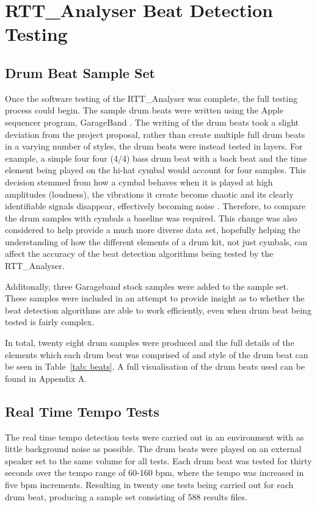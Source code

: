 \documentclass[a4paper, 11pt]{article}
\begin{document}
\maketitle{}\section{RTT\_Analyser Beat Detection Testing}
\subsection{Drum Beat Sample Set}
Once the software testing of the RTT\_Analyser was complete, the full testing process could begin. The sample drum beats were written using the Apple sequencer program, GarageBand \cite{garage}. The writing of the drum beats took a slight deviation from the project proposal, rather than create multiple full drum beats in a varying number of styles, the drum beats were instead tested in layers. For example, a simple four four (4/4) bass drum beat with a back beat and the time element being played on the hi-hat cymbal would account for four samples. This decision stemmed from how a cymbal behaves when it is played at high amplitudes (loudness), the vibrations it create become chaotic and its clearly identifiable signals disappear, effectively becoming noise \cite{soundonsound}. Therefore, to compare the drum samples with cymbals a baseline was required. This change was also considered to help provide a much more diverse data set, hopefully helping the understanding of how the different elements of a drum kit, not just cymbals, can affect the accuracy of the beat detection algorithms being tested by the RTT\_Analyser.\par

Additonally, three Garageband stock samples were added to the sample set. These samples were included in an attempt to provide insight as to whether the beat detection algorithms are able to work efficiently, even when drum beat being tested is fairly complex.

In total, twenty eight drum samples were produced and the full details of the elements which each drum beat was comprised of and style of the drum beat can be seen in Table~\ref{tab: beats}. A full visualisation of the drum beats used can be found in Appendix A.

\subsection{Real Time Tempo Tests}
The real time tempo detection tests were carried out in an environment with as little background noise as possible. The drum beats were played on an external speaker set to the same volume for all tests. Each drum beat was tested for thirty seconds over the tempo range of 60-160 bpm, where the tempo was increased in five bpm increments. Resulting in twenty one tests being carried out for each drum beat, producing a sample set consisting of 588 results files.
\end{document}
